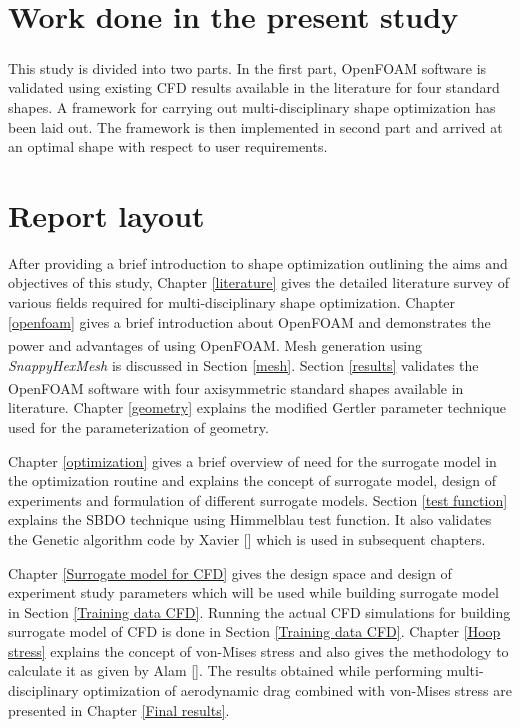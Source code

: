 \section{Work done in the present study}
This study is divided into two parts. In the first part, OpenFOAM\textsuperscript{\textregistered} software is validated using existing CFD results available in the literature for four standard shapes. A framework for carrying out multi-disciplinary shape  optimization has been laid out. The framework is then implemented in second part and arrived at an optimal shape with respect to user requirements.
\section{Report layout}
\label{layout}

After providing a brief introduction to shape optimization outlining the aims and objectives of this study, Chapter \ref{literature} gives the detailed literature survey of various fields required for multi-disciplinary shape optimization. Chapter \ref{openfoam} gives a brief introduction about OpenFOAM and demonstrates the power and advantages of using OpenFOAM\textsuperscript{\textregistered}.
Mesh generation using \textit{SnappyHexMesh} is discussed in Section \ref{mesh}. Section \ref{results} validates the OpenFOAM\textsuperscript{\textregistered} software with four axisymmetric standard shapes available in literature. Chapter \ref{geometry}  explains the modified Gertler parameter technique used for the parameterization of geometry.

Chapter \ref{optimization} gives a brief overview of need for the surrogate model in the optimization routine and explains the concept of surrogate model, design of experiments and formulation of different surrogate models. Section \ref{test function} explains the SBDO technique using Himmelblau test function. It also validates the Genetic algorithm code by Xavier [] which is used in subsequent chapters.

Chapter \ref{Surrogate model for CFD} gives the design space and design of experiment study parameters which will be used while building surrogate model in Section \ref{Training data CFD}. Running the actual CFD simulations for building surrogate model of CFD is done in Section \ref{Training data CFD}. Chapter \ref{Hoop stress} explains the concept of von-Mises stress and also gives the methodology to calculate it as given by Alam []. The results obtained while performing multi-disciplinary optimization of aerodynamic drag combined with von-Mises stress are presented in Chapter \ref{Final results}.

